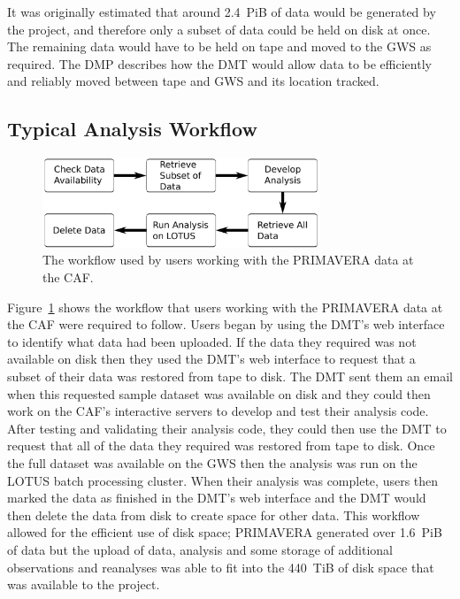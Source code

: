 \documentclass[gmd, manuscript]{copernicus}
\begin{document}
It was originally estimated that around 2.4~PiB of data would be generated by the project, and therefore only a subset of data could be held on disk at once. The remaining data would have to be held on tape and moved to the GWS as required. The DMP describes how the DMT would allow data to be efficiently and reliably moved between tape and GWS and its location tracked.

\subsection{Typical Analysis Workflow}
\label{typical_analysis_workflow}

\begin{figure}[ht]
	\includegraphics[width=8.3cm]{fig02.pdf}
	\caption{The workflow used by users working with the PRIMAVERA data at the CAF.}
	\label{analysis_workflow}
\end{figure}

Figure~\ref{analysis_workflow} shows the workflow that users working with the PRIMAVERA data at the CAF were required to follow. Users began by using the DMT's web interface to identify what data had been uploaded. If the data they required was not available on disk then they used the DMT's web interface to request that a subset of their data was restored from tape to disk. The DMT sent them an email when this requested sample dataset was available on disk and they could then work on the CAF's interactive servers to develop and test their analysis code. After testing and validating their analysis code, they could then use the DMT to request that all of the data they required was restored from tape to disk. Once the full dataset was available on the GWS then the analysis was run on the LOTUS batch processing cluster. When their analysis was complete, users then marked the data as finished in the DMT's web interface and the DMT would then delete the data from disk to create space for other data. This workflow allowed for the efficient use of disk space; PRIMAVERA generated over 1.6~PiB of data but the upload of data, analysis and some storage of additional observations and reanalyses was able to fit into the 440~TiB of disk space that was available to the project.
\end{document}
